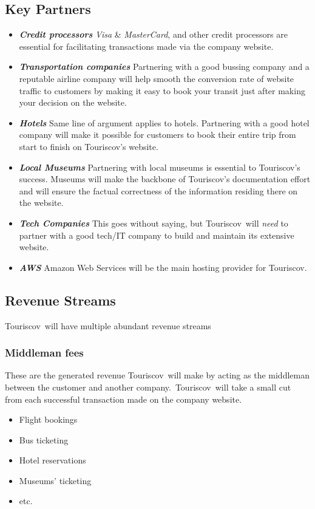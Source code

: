 \documentclass[12pt]{article}
\newcommand{\bb}[1]{\textbf{\textit{#1}}}
\newcommand{\tco}{Touriscov}
\begin{document}
\subsection{Key Partners}

\begin{itemize}
    \item \bb{Credit processors} \textit{Visa} \& \textit{MasterCard}, and other credit processors are essential for facilitating transactions made via the company website.
    \item \bb{Transportation companies} Partnering with a good bussing company and a reputable airline company will help smooth the conversion rate of website traffic to customers by making it easy to book your transit just after making your decision on the website. 
    \item \bb{Hotels} Same line of argument applies to hotels. Partnering with a good hotel company will make it possible for customers to book their entire trip from start to finish on Touriscov's website.
    \item \bb{Local Museums} Partnering with local museums is essential to Touriscov's success. Museums will make the backbone of Touriscov's documentation effort and will ensure the factual correctness of the information residing there on the website.
    \item \bb{Tech Companies} This goes without saying, but \tco\ will \textit{need} to partner with a good tech/IT company to build and maintain its extensive website.
    \item \bb{AWS} Amazon Web Services will be the main hosting provider for \tco.
\end{itemize}

\subsection{Revenue Streams}
\tco\ will have multiple abundant revenue streams 

\subsubsection{Middleman fees}
These are the generated revenue \tco\ will make by acting as the middleman between the customer and another company.\ \tco\ will take a small cut from each successful transaction made on the company website.
\begin{itemize}
    \item Flight bookings
    \item Bus ticketing
    \item Hotel reservations
    \item Museums' ticketing
    \item etc.
\end{itemize}
\end{document}
